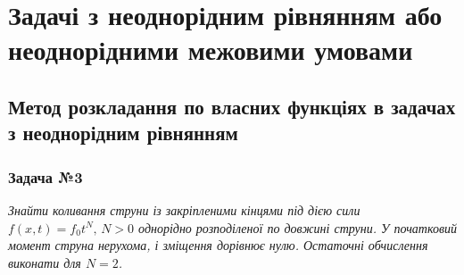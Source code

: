 \documentclass[a4paper, 14pt]{extreport}
\begin{document}
\section{Задачі з неоднорідним рівнянням або неоднорідними межовими умовами}

\subsection{Метод розкладання по власних функціях в задачах з неоднорідним рівнянням}

\subsubsection{Задача №3}

\textit{Знайти коливання струни із закріпленими кінцями під дією сили $f(x,t) = f_0 t^N, \, N > 0$ однорідно розподіленої по довжині струни. У початковий момент струна нерухома, і зміщення дорівнює нулю. Остаточні обчислення виконати
для $N=2$.}
\end{document}
